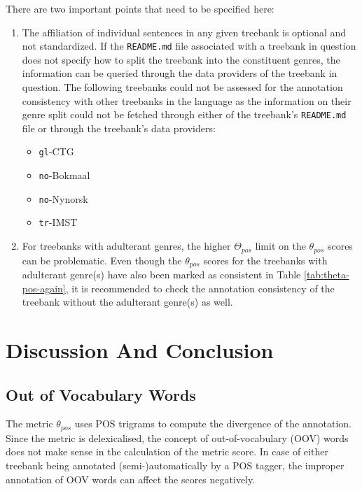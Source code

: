 There are two important points that need to be specified here:

\begin{enumerate}
    \item The affiliation of individual sentences in any given treebank is optional and not standardized. If the \texttt{README.md} file associated with a treebank in question does not specify how to split the treebank into the constituent genres, the information can be queried through the data providers of the treebank in question. The following treebanks could not be assessed for the annotation consistency with other treebanks in the language as the information on their genre split could not be fetched through either of the treebank's \texttt{README.md} file or through the treebank's data providers:
    \begin{itemize}
        \item \texttt{gl}-CTG
        \item \texttt{no}-Bokmaal
        \item \texttt{no}-Nynorsk
        \item \texttt{tr}-IMST
    \end{itemize}
    \item For treebanks with adulterant genres, the higher $\Theta_{pos}$ limit on the $\theta_{pos}$ scores can be problematic. Even though the $\theta_{pos}$ scores for the treebanks with adulterant genre(s) have also been marked as consistent in Table \ref{tab:theta-pos-again}, it is recommended to check the annotation consistency of the treebank without the adulterant genre(s) as well.
\end{enumerate}

\section{Discussion And Conclusion}
\label{sec:pos-harmony-conclusion}

\subsection{Out of Vocabulary Words}

The metric \(\theta_{pos}\) uses POS trigrams to compute the divergence of the annotation. Since the metric is delexicalised, the concept of out-of-vocabulary (OOV) words does not make sense in the calculation of the metric score. In case of either treebank being annotated (semi-)automatically by a POS tagger, the improper annotation of OOV words can affect the scores negatively.


